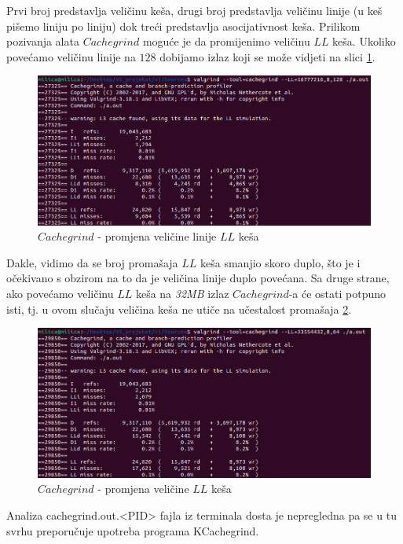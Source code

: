 \documentclass[a4paper]{article}
\begin{document}
Prvi broj predstavlja veličinu keša, drugi broj predstavlja veličinu linije (u keš pišemo liniju po liniju) dok treći predstavlja asocijativnost keša. Prilikom pozivanja alata $Cachegrind$ moguće je da promijenimo veličinu $LL$ keša. Ukoliko povećamo veličinu linije na $128$ dobijamo izlaz koji se može vidjeti na slici \ref{fig:cache4}.
	\begin{figure}[h!]
		\centering
		\caption{$Cachegrind$ - promjena veličine linije $LL$ keša}
		\label{fig:cache4}
		\includegraphics[scale=0.5]{../Valgrind/Cachegrind/cache4.png}
	\end{figure}
	
Dakle, vidimo da se broj promašaja $LL$ keša smanjio skoro duplo, što je i očekivano s obzirom na to da je veličina linije duplo povećana.
Sa druge strane, ako povećamo veličinu $LL$ keša na \textit{32MB} izlaz $Cachegrind$-a će ostati potpuno isti, tj. u ovom slučaju veličina keša ne utiče na učestalost promašaja \ref{fig:cache5}.
	\begin{figure}[h!]
		\caption{$Cachegrind$ - promjena veličine $LL$ keša}
		\label{fig:cache5}
		\includegraphics[scale=0.5]{../Valgrind/Cachegrind/cache5.png}
	\end{figure}

Analiza cachegrind.out.<PID> fajla iz terminala dosta je nepregledna pa se u tu svrhu preporučuje upotreba programa KCachegrind. 
\end{document}
